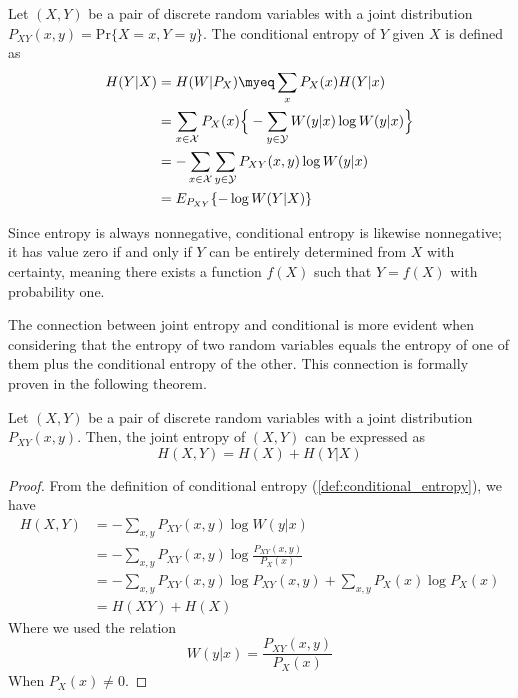 \begin{definition}\label{def:conditional_entropy}
    Let $(X,Y)$ be a pair of discrete random variables with a joint distribution $P_{XY}(x,y) = \text{Pr}\{X=x,Y=y\}$. The conditional entropy of $Y$ given $X$ is defined as
    \begin{align}
        H(Y|X) &= H(W | P_X) \myeq \sum_x P_X(x)H(Y|x) \\
        &= \sum_{x \in \mathcal{X}} P_X(x) \Big\{ -\sum_{y \in \mathcal{Y}} W(y|x) \log W(y|x) \Big\} \\
        &= -\sum_{x\in\mathcal{X}}\sum_{y\in\mathcal{Y}} P_{XY}(x,y)\log W(y|x) \\
        &= E_{P_{XY}} \{ -\log W(Y|X) \}
    \end{align}
\end{definition}

\noindent Since entropy is always nonnegative, conditional entropy is likewise nonnegative; it has value zero if and only if $Y$ can be entirely determined from $X$ with certainty, meaning there exists a function $f(X)$ such that $Y = f(X)$ with probability one. \vspace*{0.4cm}

\noindent The connection between joint entropy and conditional is more evident when considering that the entropy of two random variables equals the entropy of one of them plus the conditional entropy of the other. This connection is formally proven in the following theorem.

\begin{theorem}\label{thm:chain_rule}
        Let $(X,Y)$ be a pair of discrete random variables with a joint distribution $P_{XY}(x,y)$. Then, the joint entropy of $(X,Y)$ can be expressed as
    \begin{equation}
        H(X,Y) = H(X) + H(Y|X)
    \end{equation}
\end{theorem}
\begin{proof}
    From the definition of conditional entropy (\ref{def:conditional_entropy}), we have
    \begin{align*}
        H(X,Y) &= -\sum_{x,y} P_{XY}(x,y) \log W(y|x) \\
        &= -\sum_{x,y} P_{XY}(x,y) \log \frac{P_{XY}(x,y)}{P_X(x)} \\
        &= -\sum_{x,y} P_{XY}(x,y) \log P_{XY}(x,y) + \sum_{x,y} P_{X}(x) \log P_X(x) \\
        &= H(XY) + H(X)
    \end{align*}
    Where we used the relation
    \begin{equation}
        W(y|x) = \frac{P_{XY}(x,y)}{P_X(x)}
    \end{equation}
    When $P_X(x) \neq 0$.
\end{proof}

